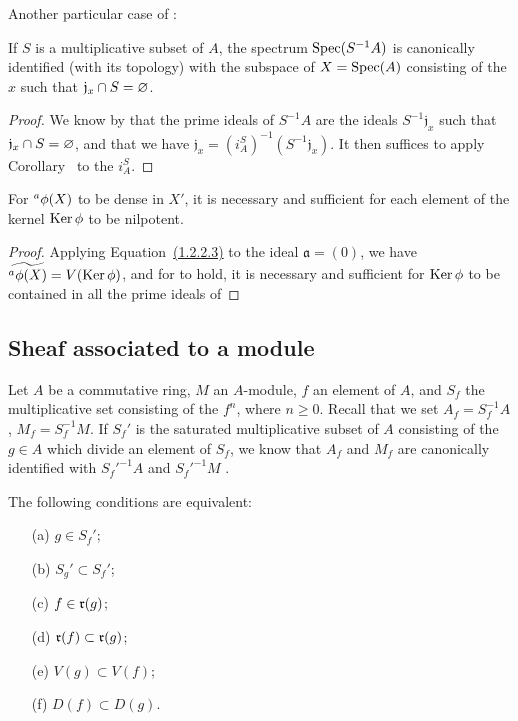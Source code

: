 Another particular case of :
\begin{corollary}[1.2.6]
\label{1.1.2.6}
If $S$ is a multiplicative subset of $A$, the spectrum $\operatorname{Spec}(S^{-1}A)$ is canonically identified (with its topology) with the subspace of $X=\operatorname{Spec}(A)$ consisting of the $x$ such that $\mathfrak{j}_x\cap S=\varnothing$.
\end{corollary}

\begin{proof}
\label{proof-1.1.2.6}
We know by  that the prime ideals of $S^{-1}A$ are the ideals $S^{-1}\mathfrak{j}_x$ such that $\mathfrak{j}_x\cap S=\varnothing$, and that we have $\mathfrak{j}_x=(i_A^S)^{-1}(S^{-1}\mathfrak{j}_x)$.
It then suffices to apply Corollary~ to the $i_A^S$.
\end{proof}

\begin{corollary}[1.2.7]
\label{1.1.2.7}
For ${}^a\phi(X)$ to be dense in $X'$, it is necessary and sufficient for each element of the kernel $\operatorname{Ker}\phi$ to be nilpotent.
\end{corollary}

\begin{proof}
\label{proof-1.1.2.7}
Applying Equation~\hyperref[1.1.2.2]{(1.2.2.3)} to the ideal $\mathfrak{a}=(0)$, we have $\widetilde{{}^a\phi(X)}=V(\operatorname{Ker}\phi)$, and for  to hold, it is necessary and sufficient for $\operatorname{Ker}\phi$ to be contained in all the prime ideals of 
\end{proof}

\subsection{Sheaf associated to a module}
\label{subsection:1.1.3}

\begin{env}[1.3.1]
\label{1.1.3.1}
Let $A$ be a commutative ring, $M$ an $A$-module, $f$ an element of $A$, and $S_f$ the multiplicative set consisting of the $f^n$, where $n\geq 0$.
Recall that we set $A_f=S_f^{-1}A$, $M_f=S_f^{-1}M$.
If $S_f'$ is the saturated multiplicative subset of $A$ consisting of the $g\in A$ which divide an element of $S_f$, we know that $A_f$ and $M_f$ are canonically identified with ${S_f'}^{-1}A$ and ${S_f'}^{-1}M$ .
\end{env}

\begin{lemma}[1.3.2]
\label{1.1.3.2}
The following conditions are equivalent:
\begin{enumerate}
  \item[{\rm(a)}] $g\in S_f'$;
  \item[{\rm(b)}] $S_g'\subset S_f'$;
  \item[{\rm(c)}] $f\in\mathfrak{r}(g)$;
  \item[{\rm(d)}] $\mathfrak{r}(f)\subset\mathfrak{r}(g)$;
  \item[{\rm(e)}] $V(g)\subset V(f)$;
  \item[{\rm(f)}] $D(f)\subset D(g)$.
\end{enumerate}
\end{lemma}

